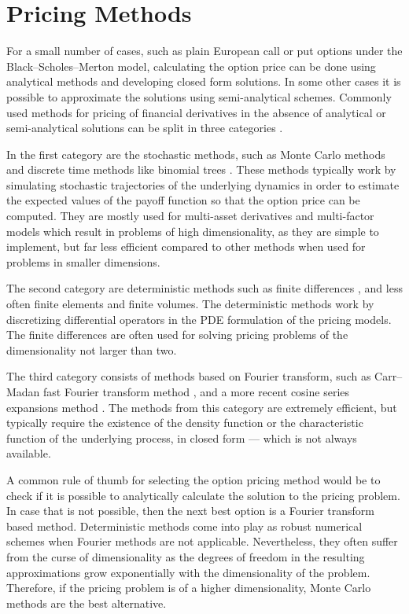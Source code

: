 \documentclass{UUThesisTemplate}
\begin{document}
\section{Pricing Methods}
\label{sec:methods}
\par For a small number of cases, such as plain European call or put options under the Black--Scholes--Merton model, calculating the option price can be done using analytical methods and developing closed form solutions. In some other cases it is possible to approximate the solutions using semi-analytical schemes. Commonly used methods for pricing of financial derivatives in the absence of analytical or semi-analytical solutions can be split in three categories \cite{paper2}. 
\par In the first category are the stochastic methods, such as Monte Carlo methods \cite{glasserman2013monte, longstaff2001valuing} and discrete time methods like binomial trees \cite{cox1979option, rendleman1979two}. These methods typically work by simulating stochastic trajectories of the underlying dynamics in order to estimate the expected values of the payoff function so that the option price can be computed. They are mostly used for multi-asset derivatives and multi-factor models which result in problems of high dimensionality, as they are simple to implement, but far less efficient compared to other methods when used for problems in smaller dimensions. 
\par The second category are deterministic methods such as finite differences \cite{tavella2000pricing}, and less often finite elements and finite volumes. The deterministic methods work by discretizing differential operators in the PDE formulation of the pricing models. The finite differences are often used for solving pricing problems of the dimensionality not larger than two.
\par The third category consists of methods based on Fourier transform, such as Carr--Madan fast Fourier transform method \cite{carr1999option}, and a more recent cosine series expansions method \cite{fang2008novel}. The methods from this category are extremely efficient, but typically require the existence of the density function or the characteristic function of the underlying process, in closed form --- which is not always available.
\par A common rule of thumb for selecting the option pricing method would be to check if it is possible to analytically calculate the solution to the pricing problem. In case that is not possible, then the next best option is a Fourier transform based method. Deterministic methods come into play as robust numerical schemes when Fourier methods are not applicable. Nevertheless, they often suffer from the curse of dimensionality as the degrees of freedom in the resulting approximations grow exponentially with the dimensionality of the problem. Therefore, if the pricing problem is of a higher dimensionality, Monte Carlo methods are the best alternative.
\end{document}
